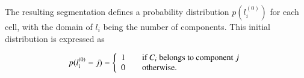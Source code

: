 The resulting segmentation defines a probability distribution $p(l_i^{(0)})$ for
each cell, with the domain of $l_i$ being the number of components. This initial
distribution is expressed as

\begin{equation}
\label{eqn:comp_pred}
p(l_i^{(0)}=j) = \left\{
\begin{array}{l l}
1 & \quad \text{if $C_i$ belongs to component $j$}\\
0 & \quad \text{otherwise}.
\end{array} \right.
\end{equation}
